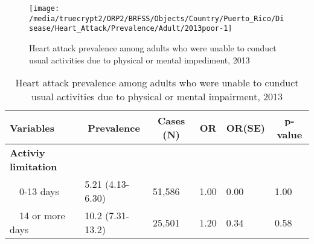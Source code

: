 \begin{figure}[H]
\caption{Heart attack prevalence among adults who were unable to conduct usual activities due to physical or mental impediment, 2013}
\label{fig:poor.Heart_Attack.2013}

\begin{knitrout}
\color{fgcolor}

{\centering \texttt{[image: /media/truecrypt2/ORP2/BRFSS/Objects/Country/Puerto\_Rico/Disease/Heart\_Attack/Prevalence/Adult/2013poor-1]} 

}



\end{knitrout}
\end{figure}

\begin{table}[H]
\caption{Heart attack prevalence among adults who were unable to cunduct usual activities due to physical or mental impairment, 2013\label{tab:poor.Heart_Attack.2013}} 
\begin{center}
\begin{tabular}{llllll}
\hline\hline
\multicolumn{1}{l}{Variables}&\multicolumn{1}{c}{Prevalence}&\multicolumn{1}{c}{Cases (N)}&\multicolumn{1}{c}{OR}&\multicolumn{1}{c}{OR(SE)}&\multicolumn{1}{c}{p-value}\tabularnewline
\hline
{\bfseries Activiy limitation}&&&&&\tabularnewline
~~0-13 days&5.21 (4.13-6.30)&51,586&1.00&0.00&1.00\tabularnewline
~~14 or more days&10.2 (7.31-13.2)&25,501&1.20&0.34&0.58\tabularnewline
\hline
\end{tabular}\end{center}

\end{table}


